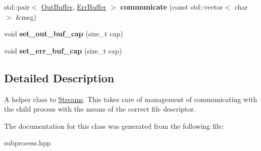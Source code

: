 \begin{DoxyCompactItemize}
std\+::pair$<$ \hyperlink{classsubprocess_1_1Buffer}{Out\+Buffer}, \hyperlink{classsubprocess_1_1Buffer}{Err\+Buffer} $>$ {\bfseries communicate} (const std\+::vector$<$ char $>$ \&msg)
\item 
\mbox{\label{classsubprocess_1_1detail_1_1Communication_a5197c3390f95df0dfd64f75fd771dfd5}} 
void {\bfseries set\+\_\+out\+\_\+buf\+\_\+cap} (size\+\_\+t cap)
\item 
\mbox{\label{classsubprocess_1_1detail_1_1Communication_a04ed0a2b92b10ef22321fb49e1d51d81}} 
void {\bfseries set\+\_\+err\+\_\+buf\+\_\+cap} (size\+\_\+t cap)
\end{DoxyCompactItemize}


\subsection{Detailed Description}
A helper class to \hyperlink{classsubprocess_1_1detail_1_1Streams}{Streams}. This takes care of management of communicating with the child process with the means of the correct file descriptor. 

The documentation for this class was generated from the following file\+:\begin{DoxyCompactItemize}
\item 
subprocess.\+hpp\end{DoxyCompactItemize}
